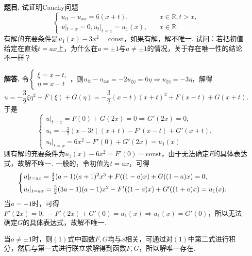 \documentclass[12pt, a4paper, oneside]{ctexart}
\newcounter{problem}  %
\newenvironment{problem}{\stepcounter{problem}\par\noindent\textbf{题目\arabic{problem}. }}{\smallskip\par}
\newenvironment{solution}{\par\noindent\textbf{解答. }}{\smallskip\par}
\def\R{\mathbb{R}}          %
\def\add{\vspace{1ex}}      %
\begin{document}
\begin{problem}
    试证明Cauchy问题
    \begin{equation*}
        \begin{cases}
            u_{tt}-u_{xx} = 6(x+t),&\quad x\in\R,t > x,\\
            u|_{t=x} = 0, u_t|_{t=x}=u_1(x),&\quad x\in\R.
        \end{cases}
    \end{equation*}
    有解的充要条件是$u_1(x)-3x^2=\text{const}$，如果有解，解不唯一. 试问：若把初值给定在直线$t=ax$上，为什么在$a=\pm 1$与$a\neq \pm 1$的情况，关于存在唯一性的结论不一样？
\end{problem}
\begin{solution}
    令$\begin{cases}
        \xi = x-t,\\\eta = x+t
    \end{cases}$，则$u_{tt}-u_{xx} = -2u_{\xi\eta} = 6\eta\Rightarrow u_{\xi\eta} = -3\eta$，解得
    \begin{equation*}
        u = -\frac{3}{2}\xi\eta^2+F(\xi)+G(\eta) = -\frac{3}{2}(x-t)(x+t)^2+F(x-t)+G(x+t).
    \end{equation*}
    于是
    \begin{equation*}
        \begin{cases}
            u|_{t=x} = F(0)+G(2x) = 0\Rightarrow G'(2x) = 0,\\
            u_t = -\frac{3}{2}(x-3t)(x+t)-F'(x-t)+G'(x+t),\\
            u_t|_{t=x} = 6x^2-F'(0)+G'(2x) = u_1(x)
        \end{cases}
    \end{equation*}
    则有解的充要条件为$u_1(x) - 6x^2 = F'(0) = \text{const}$，由于无法确定$F$的具体表达式，故解不唯一. 一般的，令初值为$t = ax$，可得
    \begin{equation}
        \begin{cases}
            u|_{t=ax} = \frac{3}{2}(a-1)(a+1)^2x^3+F((1-a)x)+G((1+a)x)=0,\add\\
            u_t|_{t=ax} = \frac{3}{2}(3a-1)(a+1)x^2-F'((1-a)x)+G'((1+a)x)=u_1(x).
        \end{cases}
    \end{equation}
    当$a=-1$时，可得$F'(2x) = 0,\ -F'(2x)+G'(0) = u_1(x)\Rightarrow u_1(x) = G'(0)$，所以无法确定$G$的具体表达式，故解不唯一.

    当$a\neq \pm 1$时，则$(1)$式中函数$F,G$均与$x$相关，可通过对$(1)$中第二式进行积分，然后与第一式进行联立求解得到函数$F,G$，所以解唯一存在.
\end{solution}
\end{document}
